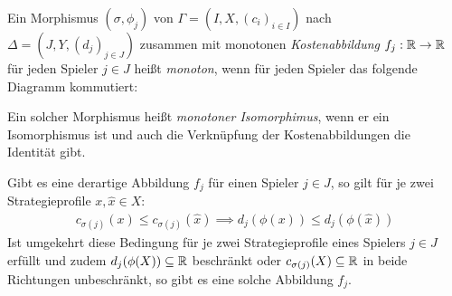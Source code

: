 \begin{defn}
	Ein Morphismus $(\sigma, \phi_j)$ von $\Gamma = (I, X, (c_i)_{i\in I})$ nach $\Delta = (J, Y, (d_j)_{j\in J})$ zusammen mit monotonen \emph{Kostenabbildung} $f_j: \mathbb{R} \to \mathbb{R}$ für jeden Spieler $j \in J$ heißt \emph{monoton}, wenn für jeden Spieler das folgende Diagramm kommutiert:	
	\begin{center}
	\end{center}
	Ein solcher Morphismus heißt \emph{monotoner Isomorphimus}, wenn er ein Isomorphismus ist und auch die Verknüpfung der Kostenabbildungen die Identität gibt.
\end{defn}

\begin{bem}
	Gibt es eine derartige Abbildung $f_j$ für einen Spieler $j \in J$, so gilt für je zwei Strategieprofile $x, \hat{x} \in X$:
		\begin{align}\label{eq:CharExMonMor}
			c_{\sigma(j)}(x) \leq c_{\sigma(j)}(\hat{x}) \implies d_j(\phi(x)) \leq d_j(\phi(\hat{x}))
		\end{align}
	Ist umgekehrt diese Bedingung für je zwei Strategieprofile eines Spielers $j \in J$ erfüllt und zudem $d_j(\phi(X)) \subseteq \mathbb{R}$ beschränkt oder $c_{\sigma(j)}(X) \subseteq \mathbb{R}$ in beide Richtungen unbeschränkt, so gibt es eine solche Abbildung $f_j$.
\end{bem}

